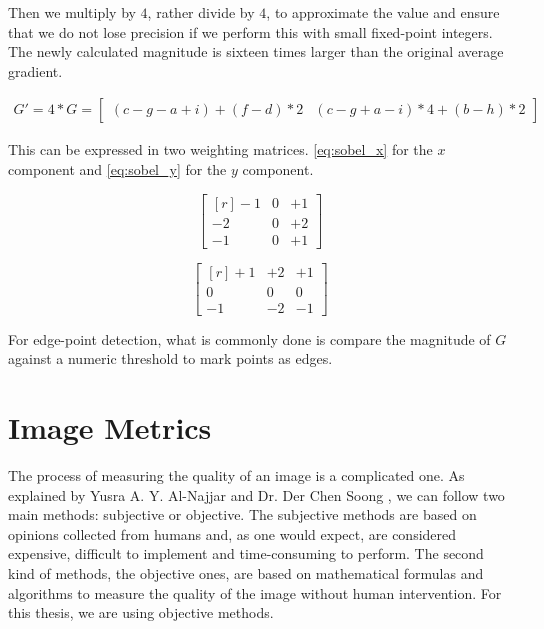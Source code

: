 \documentclass{cslthse-msc}
\begin{document}
Then we multiply by $4$, rather divide by $4$, to approximate the value and ensure that we do not lose precision if we perform this with small fixed-point integers. The newly calculated magnitude is sixteen times larger than the original average gradient.

\begin{equation}\label{eq:sobel_approximation}
\begin{split}
G' = 4 * G =\begin{bmatrix*}(c-g-a+i)+(f-d)*2 & (c-g+a-i)*4+(b-h)*2\end{bmatrix*}
\end{split}
\end{equation}

This can be expressed in two weighting matrices. \ref{eq:sobel_x} for the $x$ component and \ref{eq:sobel_y} for the $y$ component.

\begin{equation}
\begin{bmatrix*}[r]\label{eq:sobel_x}
-1 &  0 & +1 \\
-2 &  0 & +2 \\
-1 &  0 & +1
\end{bmatrix*}
\end{equation}

\begin{equation}
\begin{bmatrix*}[r]\label{eq:sobel_y}
+1 & +2 & +1 \\
 0 &  0 &  0 \\
-1 & -2 & -1
\end{bmatrix*}
\end{equation}

For edge-point detection, what is commonly done is compare the magnitude of $G$ against a numeric threshold to mark points as edges. 

\section{Image Metrics}
The process of measuring the quality of an image is a complicated one. As explained by Yusra A. Y. Al-Najjar and Dr. Der Chen Soong \cite{Yusra2012}, we can follow two main methods: subjective or objective. The subjective methods are based on opinions collected from humans and, as one would expect, are considered expensive, difficult to implement and time-consuming to perform. The second kind of methods, the objective ones, are based on mathematical formulas and algorithms to measure the quality of the image without human intervention. For this thesis, we are using objective methods. 
\end{document}
